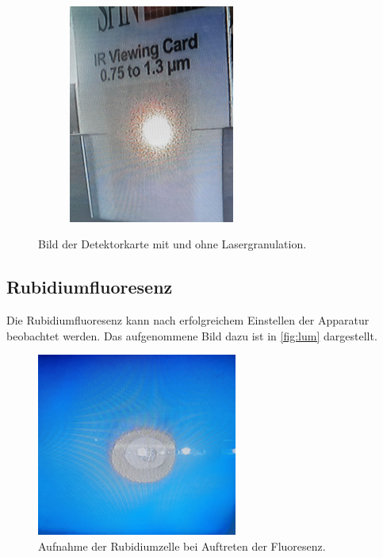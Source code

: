 \begin{figure}
\begin{subfigure}[c]{0.5\textwidth}
    \end{subfigure}
    \hfill
    \begin{subfigure}[c]{0.5\textwidth}
        \centering
        \includegraphics[width=0.6\textwidth]{content/pics/3.jpg}
    \end{subfigure}

    \caption{Bild der Detektorkarte mit und ohne Lasergranulation.}
    \label{fig:granulation}
\end{figure}

\subsection{Rubidiumfluoresenz}
\label{sec:rubidium}
Die Rubidiumfluoresenz kann nach erfolgreichem Einstellen der Apparatur beobachtet werden. Das aufgenommene Bild
dazu ist in \autoref{fig:lum} dargestellt.
\begin{figure}
    \centering
    \includegraphics[height=6cm]{content/pics/4.jpg}
    \caption{Aufnahme der Rubidiumzelle bei Auftreten der Fluoresenz.}
    \label{fig:lum}
\end{figure}

